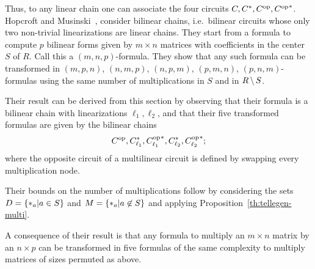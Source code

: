   Thus, to any
linear chain one can associate the four circuits
$C,C^\ast,C^{\mathrm{op}},{C^{\mathrm{op}}}^\ast$. Hopcroft and
Musinski~\cite{hopcroft+musinski73}, consider
bilinear chains, i.e.\ bilinear circuits whose
only two non-trivial linearizations are linear chains.  They start
from a formula to compute $p$ bilinear forms given by $m\times n$
matrices with coefficients in the center $S$ of $R$. Call this a
$(m,n,p)$-formula. They show that any such formula can be transformed
in $(m,p,n)$, $(n,m,p)$, $(n,p,m)$, $(p,m,n)$, $(p,n,m)$-formulas
using the same number of multiplications in $S$ and in $R\,\backslash\,
S$.

Their result can be derived from this section by observing that their
formula is a bilinear chain with linearizations $\ell_1,\ell_2$, and
that their five transformed formulas are given by the bilinear chains
\[C^{\mathrm{op}},C_{\ell_1}^\ast,{C_{\ell_1}^{\mathrm{op}}}^\ast,C_{\ell_2}^\ast,{C_{\ell_2}^{\mathrm{op}}}^\ast\text{;}\]
where the opposite circuit of a multilinear circuit is defined by
swapping every multiplication node. 

Their bounds on the number of multiplications follow by considering
the sets $D=\{*_{a}|a\in S\}$ and $M=\{*_{a}|a\not\in S\}$ and
applying Proposition~\ref{th:tellegen-multi}.

A consequence of their result is that any formula to multiply an
$m\times n$ matrix by an $n\times p$ can be transformed in five
formulas of the same complexity to multiply matrices of sizes permuted
as above.



%
